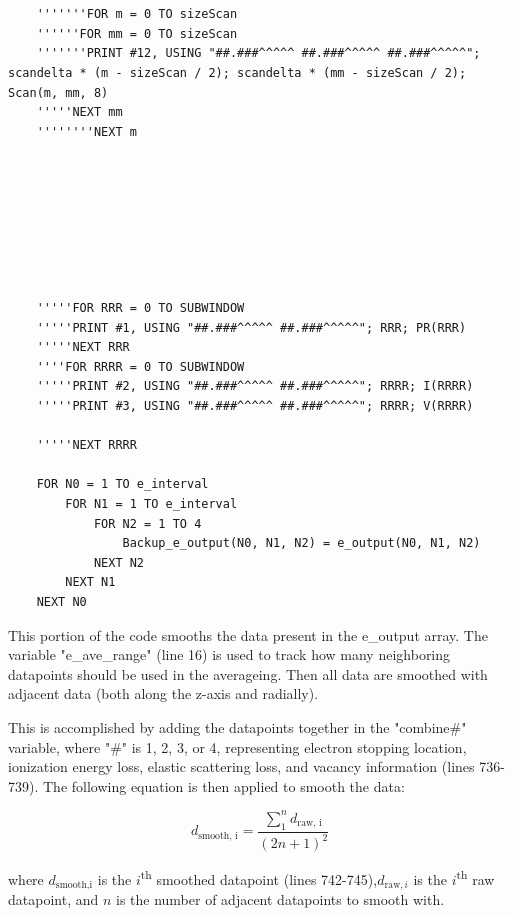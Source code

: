 \documentclass[10pt, reqno]{exam}
\begin{document}
\begin{verbatim}
    
    
    '''''''FOR m = 0 TO sizeScan
    ''''''FOR mm = 0 TO sizeScan
    '''''''PRINT #12, USING "##.###^^^^^ ##.###^^^^^ ##.###^^^^^"; scandelta * (m - sizeScan / 2); scandelta * (mm - sizeScan / 2); Scan(m, mm, 8)
    '''''NEXT mm
    ''''''''NEXT m
    
    
    
    
    
    
    
    
    '''''FOR RRR = 0 TO SUBWINDOW
    '''''PRINT #1, USING "##.###^^^^^ ##.###^^^^^"; RRR; PR(RRR)
    '''''NEXT RRR
    ''''FOR RRRR = 0 TO SUBWINDOW
    '''''PRINT #2, USING "##.###^^^^^ ##.###^^^^^"; RRRR; I(RRRR)
    '''''PRINT #3, USING "##.###^^^^^ ##.###^^^^^"; RRRR; V(RRRR)
    
    '''''NEXT RRRR
    
    FOR N0 = 1 TO e_interval
        FOR N1 = 1 TO e_interval
            FOR N2 = 1 TO 4
                Backup_e_output(N0, N1, N2) = e_output(N0, N1, N2)
            NEXT N2
        NEXT N1
    NEXT N0
\end{verbatim}

This portion of the code smooths the data present in the e\_output array. The variable "e\_ave\_range" (line 16) is used to track how many neighboring datapoints should be used in the averageing. Then all data are smoothed with adjacent data (both along the z-axis and radially). \par

This is accomplished by adding the datapoints together in the "combine\#" variable, where "\#" is 1, 2, 3, or 4, representing electron stopping location, ionization energy loss, elastic scattering loss, and vacancy information (lines 736-739). The following equation is then applied to smooth the data: \par

\begin{equation}
    d_{\text{smooth, i}} = \frac{\sum_1^{n}d_{\text{raw, i}}}{(2n + 1)^2}
\end{equation}

where $d_{\text{smooth,i}}$ is the $i$\textsuperscript{th} smoothed datapoint (lines 742-745),$d_{\text{raw}, i}$ is the $i$\textsuperscript{th} raw datapoint, and $n$ is the number of adjacent datapoints to smooth with.
\end{document}
